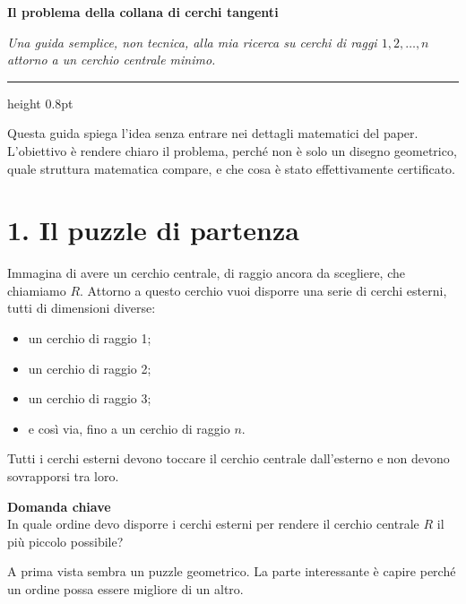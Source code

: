 \documentclass[11pt,a4paper]{article}
\newcommand{\custombox}[2]{
  \par\smallskip\noindent
  \colorbox{softgray}{
    \begin{minipage}{\dimexpr\textwidth-2\fboxsep\relax}
      \vspace{0.5em}
      \hspace{0.8em}%
      \begin{minipage}{\dimexpr\textwidth-2\fboxsep-1.6em\relax}
        {\color{navy}\textbf{\normalsize #1}} \\[0.2em]
        \color{charcoal}\small #2
      \end{minipage}%
      \vspace{0.5em}
    \end{minipage}
  }\par\smallskip
}
\begin{document}
\color{charcoal}

\begin{center}
    \vspace*{0.1cm}
    {\color{navy}\LARGE\bfseries Il problema della collana di cerchi tangenti \par}
    \vspace{0.4em}
    {\color{slate}\normalsize\itshape Una guida semplice, non tecnica, alla mia ricerca su cerchi di raggi $1, 2, \dots, n$ attorno a un cerchio centrale minimo. \par}
    \vspace{0.6em}
    \hrule height 0.8pt
    \vspace{0.6em}
\end{center}

Questa guida spiega l'idea senza entrare nei dettagli matematici del paper. L'obiettivo è rendere chiaro il problema, perché non è solo un disegno geometrico, quale struttura matematica compare, e che cosa è stato effettivamente certificato.

{\color{navy}\section*{1. Il puzzle di partenza}}

Immagina di avere un cerchio centrale, di raggio ancora da scegliere, che chiamiamo $R$. Attorno a questo cerchio vuoi disporre una serie di cerchi esterni, tutti di dimensioni diverse:
\begin{itemize}
    \setlength{\itemsep}{0pt}
    \setlength{\parskip}{0pt}
    \item un cerchio di raggio 1;
    \item un cerchio di raggio 2;
    \item un cerchio di raggio 3;
    \item e così via, fino a un cerchio di raggio $n$.
\end{itemize}

Tutti i cerchi esterni devono toccare il cerchio centrale dall'esterno e non devono sovrapporsi tra loro.

\custombox{\color{accent}Domanda chiave}{
    In quale ordine devo disporre i cerchi esterni per rendere il cerchio centrale $R$ il più piccolo possibile?
}

A prima vista sembra un puzzle geometrico. La parte interessante è capire perché un ordine possa essere migliore di un altro.
\end{document}
